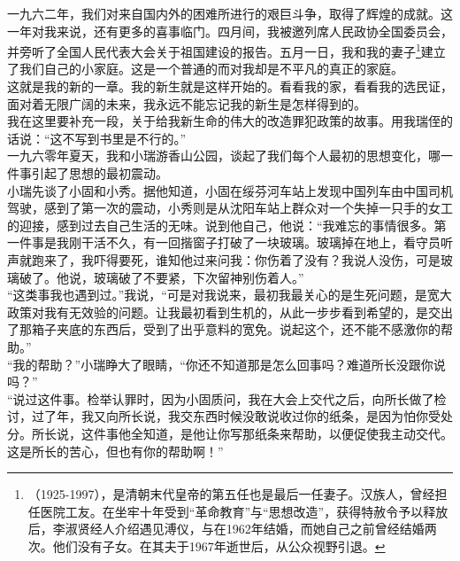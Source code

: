 一九六二年，我们对来自国内外的困难所进行的艰巨斗争，取得了辉煌的成就。这一年对我来说，还有更多的喜事临门。四月间，我被邀列席人民政协全国委员会，并旁听了全国人民代表大会关于祖国建设的报告。五月一日，我和我的妻子\footnote{（1925-1997），是清朝末代皇帝的第五任也是最后一任妻子。汉族人，曾经担任医院工友。在坐牢十年受到“革命教育”与“思想改造”，获得特赦令予以释放后，李淑贤经人介绍遇见溥仪，与在1962年结婚，而她自己之前曾经结婚两次。他们没有子女。在其夫于1967年逝世后，从公众视野引退。}建立了我们自己的小家庭。这是一个普通的而对我却是不平凡的真正的家庭。\\

这就是我的新的一章。我的新生就是这样开始的。看看我的家，看看我的选民证，面对着无限广阔的未来，我永远不能忘记我的新生是怎样得到的。\\

我在这里要补充一段，关于给我新生命的伟大的改造罪犯政策的故事。用我瑞侄的话说：“这不写到书里是不行的。”\\

一九六零年夏天，我和小瑞游香山公园，谈起了我们每个人最初的思想变化，哪一件事引起了思想的最初震动。\\

小瑞先谈了小固和小秀。据他知道，小固在绥芬河车站上发现中国列车由中国司机驾驶，感到了第一次的震动，小秀则是从沈阳车站上群众对一个失掉一只手的女工的迎接，感到过去自己生活的无味。说到他自己，他说：“我难忘的事情很多。第一件事是我刚干活不久，有一回揩窗子打破了一块玻璃。玻璃掉在地上，看守员听声就跑来了，我吓得要死，谁知他过来问我：你伤着了没有？我说人没伤，可是玻璃破了。他说，玻璃破了不要紧，下次留神别伤着人。”\\

“这类事我也遇到过。”我说，“可是对我说来，最初我最关心的是生死问题，是宽大政策对我有无效验的问题。让我最初看到生机的，从此一步步看到希望的，是交出了那箱子夹底的东西后，受到了出乎意料的宽免。说起这个，还不能不感激你的帮助。”\\

“我的帮助？”小瑞睁大了眼睛，“你还不知道那是怎么回事吗？难道所长没跟你说吗？”\\

“说过这件事。检举认罪时，因为小固质问，我在大会上交代之后，向所长做了检讨，过了年，我又向所长说，我交东西时候没敢说收过你的纸条，是因为怕你受处分。所长说，这件事他全知道，是他让你写那纸条来帮助，以便促使我主动交代。这是所长的苦心，但也有你的帮助啊！”\\

